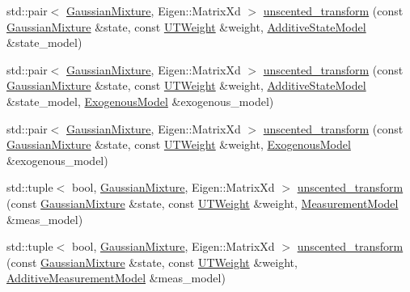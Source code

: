 \begin{DoxyCompactItemize}
std\+::pair$<$ \mbox{\hyperlink{classbfl_1_1GaussianMixture}{Gaussian\+Mixture}}, Eigen\+::\+Matrix\+Xd $>$ \mbox{\hyperlink{namespacebfl_1_1sigma__point_ab1a8018531dbd8a28c08dd3418d1976d}{unscented\+\_\+transform}} (const \mbox{\hyperlink{classbfl_1_1GaussianMixture}{Gaussian\+Mixture}} \&state, const \mbox{\hyperlink{structbfl_1_1sigma__point_1_1UTWeight}{U\+T\+Weight}} \&weight, \mbox{\hyperlink{classbfl_1_1AdditiveStateModel}{Additive\+State\+Model}} \&state\+\_\+model)
\item 
std\+::pair$<$ \mbox{\hyperlink{classbfl_1_1GaussianMixture}{Gaussian\+Mixture}}, Eigen\+::\+Matrix\+Xd $>$ \mbox{\hyperlink{namespacebfl_1_1sigma__point_aa14b7405b4800c5382d402b2446f89c6}{unscented\+\_\+transform}} (const \mbox{\hyperlink{classbfl_1_1GaussianMixture}{Gaussian\+Mixture}} \&state, const \mbox{\hyperlink{structbfl_1_1sigma__point_1_1UTWeight}{U\+T\+Weight}} \&weight, \mbox{\hyperlink{classbfl_1_1AdditiveStateModel}{Additive\+State\+Model}} \&state\+\_\+model, \mbox{\hyperlink{classbfl_1_1ExogenousModel}{Exogenous\+Model}} \&exogenous\+\_\+model)
\item 
std\+::pair$<$ \mbox{\hyperlink{classbfl_1_1GaussianMixture}{Gaussian\+Mixture}}, Eigen\+::\+Matrix\+Xd $>$ \mbox{\hyperlink{namespacebfl_1_1sigma__point_ad1df67122c8b838ae669d1f2e0665481}{unscented\+\_\+transform}} (const \mbox{\hyperlink{classbfl_1_1GaussianMixture}{Gaussian\+Mixture}} \&state, const \mbox{\hyperlink{structbfl_1_1sigma__point_1_1UTWeight}{U\+T\+Weight}} \&weight, \mbox{\hyperlink{classbfl_1_1ExogenousModel}{Exogenous\+Model}} \&exogenous\+\_\+model)
\item 
std\+::tuple$<$ bool, \mbox{\hyperlink{classbfl_1_1GaussianMixture}{Gaussian\+Mixture}}, Eigen\+::\+Matrix\+Xd $>$ \mbox{\hyperlink{namespacebfl_1_1sigma__point_a5b51d83e121121ecc6d65e9e5e7d6859}{unscented\+\_\+transform}} (const \mbox{\hyperlink{classbfl_1_1GaussianMixture}{Gaussian\+Mixture}} \&state, const \mbox{\hyperlink{structbfl_1_1sigma__point_1_1UTWeight}{U\+T\+Weight}} \&weight, \mbox{\hyperlink{classbfl_1_1MeasurementModel}{Measurement\+Model}} \&meas\+\_\+model)
\item 
std\+::tuple$<$ bool, \mbox{\hyperlink{classbfl_1_1GaussianMixture}{Gaussian\+Mixture}}, Eigen\+::\+Matrix\+Xd $>$ \mbox{\hyperlink{namespacebfl_1_1sigma__point_a27f6087b127407402338b68bf7853ae6}{unscented\+\_\+transform}} (const \mbox{\hyperlink{classbfl_1_1GaussianMixture}{Gaussian\+Mixture}} \&state, const \mbox{\hyperlink{structbfl_1_1sigma__point_1_1UTWeight}{U\+T\+Weight}} \&weight, \mbox{\hyperlink{classbfl_1_1AdditiveMeasurementModel}{Additive\+Measurement\+Model}} \&meas\+\_\+model)
\end{DoxyCompactItemize}


